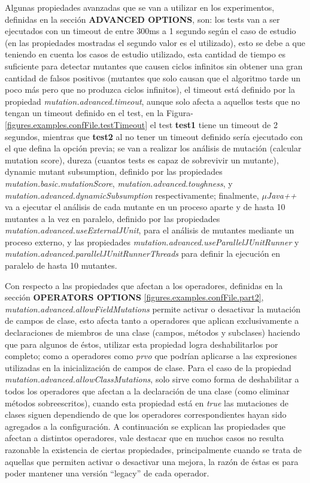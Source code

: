 Algunas propiedades avanzadas que se van a utilizar en los experimentos, definidas en la secci\'on \textbf{ADVANCED OPTIONS}, son: los tests van a ser ejecutados con un timeout de entre 300ms a 1 segundo seg\'un el caso de estudio (en las propiedades mostradas el segundo valor es el utilizado), esto se debe a que teniendo en cuenta los casos de estudio utilizado, esta cantidad de tiempo es suficiente para detectar mutantes que causen ciclos infinitos sin obtener una gran cantidad de falsos positivos (mutantes que solo causan que el algoritmo tarde un poco m\'as pero que no produzca ciclos infinitos), el timeout est\'a definido por la propiedad \emph{mutation.advanced.timeout}, aunque solo afecta a aquellos tests que no tengan un timeout definido en el test, en la Figura-\ref{figures.examples.confFile.testTimeout} el test \textbf{test1} tiene un timeout de 2 segundos, mientras que \textbf{test2} al no tener un timeout definido ser\'ia ejecutado con el que defina la opci\'on previa; se van a realizar los an\'alisis de mutaci\'on (calcular mutation score), dureza (cuantos tests es capaz de sobrevivir un mutante), dynamic mutant subsumption, definido por las propiedades \emph{mutation.basic.mutationScore}, \emph{mutation.advanced.toughness}, y \emph{mutation.advanced.dynamicSubsumption} respectivamente; finalmente, \emph{$\mu$Java++} va a ejecutar el an\'alisis de cada mutante en un proceso aparte y de hasta 10 mutantes a la vez en paralelo, definido por las propiedades \emph{mutation.advanced.useExternalJUnit}, para el an\'alisis de mutantes mediante un proceso externo, y las propiedades \emph{mutation.advanced.useParallelJUnitRunner} y \emph{mutation.advanced.parallelJUnitRunnerThreads} para definir la ejecuci\'on en paralelo de hasta 10 mutantes.

Con respecto a las propiedades que afectan a los operadores, definidas en la secci\'on \textbf{OPERATORS OPTIONS} \ref{figures.examples.confFile.part2}, \emph{mutation.advanced.allowFieldMutations} permite activar o desactivar la mutaci\'on de campos de clase, esto afecta tanto a operadores que aplican exclusivamente a declaraciones de miembros de una clase (campos, m\'etodos y subclases) haciendo que para algunos de \'estos, utilizar esta propiedad logra deshabilitarlos por completo; como a operadores como \emph{prvo} que podr\'ian aplicarse a las expresiones utilizadas en la inicializaci\'on de campos de clase. Para el caso de la propiedad \emph{mutation.advanced.allowClassMutations}, solo sirve como forma de deshabilitar a todos los operadores que afectan a la declaraci\'on de una clase (como eliminar m\'etodos sobreescritos), cuando esta propiedad est\'a en \emph{true} las mutaciones de clases siguen dependiendo de que los operadores correspondientes hayan sido agregados a la configuraci\'on. A continuaci\'on se explican las propiedades que afectan a distintos operadores, vale destacar que en muchos casos no resulta razonable la existencia de ciertas propiedades, principalmente cuando se trata de aquellas que permiten activar o desactivar una mejora, la raz\'on de \'estas es para poder mantener una versi\'on ``legacy'' de cada operador.

